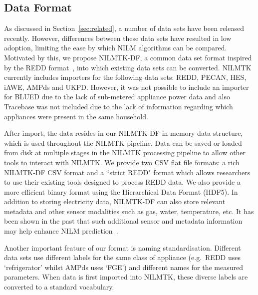 \documentclass{sig-alternate}
\newcommand{\secref}[1]{Section~\ref{#1}}
\begin{document}


\subsection{Data Format}

\noindent
As discussed in \secref{sec:related}, a number of data sets have been
released recently. However, differences between these data sets have
resulted in low adoption, limiting the ease by which NILM algorithms
can be compared. Motivated by this, we propose NILMTK-DF, a common
data set format inspired by the REDD format~\cite{REDD}, into which
existing data sets can be converted. NILMTK currently includes
importers for the following data sets: REDD, PECAN, HES, iAWE, AMPds
and UKPD. However, it was not possible to include an importer for
BLUED due to the lack of sub-metered appliance power data and also
Tracebase was not included due to the lack of information regarding
which appliances were present in the same household.

After import, the data resides in our NILMTK-DF in-memory data structure, which is used throughout the NILMTK pipeline. Data can be saved or loaded from disk at multiple stages in the NILMTK processing pipeline to allow other tools to interact with NILMTK.  We provide two CSV flat file formats: a rich NILMTK-DF CSV format and a ``strict REDD" format which allows researchers to use their existing tools designed to process REDD data.  We also provide a more efficient binary format using the Hierarchical Data Format (HDF5).  In addition to storing electricity data, NILMTK-DF can also store relevant metadata and other sensor modalities such as gas, water, temperature, etc. It has been shown in the past that such additional sensor and metadata information may help enhance NILM prediction~\cite{schoofs_2010}. 

Another important feature of our format is naming standardisation.  Different data sets use different labels for the same class of appliance (e.g.\ REDD uses `refrigerator' whilst AMPds uses `FGE') and different names for the measured parameters.  When data is first imported into NILMTK, these diverse labels are converted to a standard vocabulary.
\end{document}
